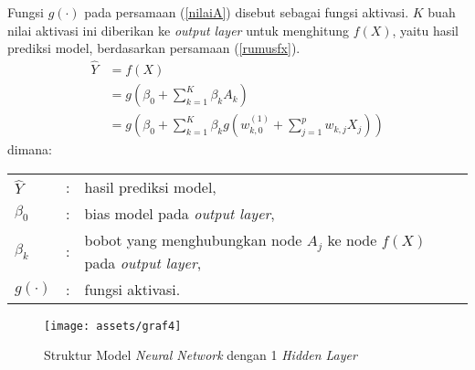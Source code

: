 \documentclass[a4paper,12pt]{report}
\begin{document}
Fungsi $g(\cdot)$ pada persamaan (\ref{nilaiA}) disebut sebagai fungsi aktivasi. $K$ buah nilai aktivasi ini diberikan ke \textit{output layer} untuk menghitung $f(X)$, yaitu hasil prediksi model, berdasarkan persamaan (\ref{rumusfx}).
\begin{equation}
	\begin{split}
		\hat{Y} &= f(X) \\
		&= g\left(\beta_{0} + \sum\limits_{k=1}^{K}\beta_{k}A_{k}\right) \\
		&= g\left(\beta_{0} + \sum\limits_{k=1}^{K}\beta_{k}g\left(w_{k,0}^{(1)} + \sum\limits_{j=1}^{p}w_{k,j}X_{j}\right)\right)
	\end{split}
	\label{rumusfx}
\end{equation}
\noindent dimana: \\
\begin{tabular}{l c l}
	$\hat{Y}$ &:& hasil prediksi model, \\
	$\beta_{0}$ &:& bias model pada \textit{output layer}, \\
	$\beta_{k}$ &:& bobot yang menghubungkan node $A_j$ ke node $f(X)$ pada \textit{output layer}, \\
	$g(\cdot)$ &:& fungsi aktivasi.
\end{tabular}

\begin{figure}[H]
	\center \texttt{[image: assets/graf4]}
	\caption{Struktur Model \textit{Neural Network} dengan 1 \textit{Hidden Layer}} 
	\label{NN1layer}
\end{figure}
\end{document}
